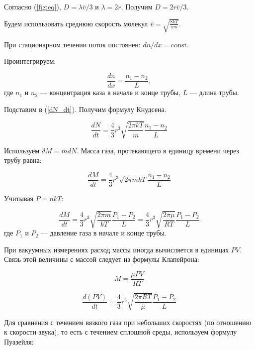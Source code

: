 \documentclass[a4paper,12pt]{article} %
\begin{document}
Согласно (\ref{fig:eq}), $D = \lambda \bar{v} / 3$ и $\lambda = 2r$. Получим $D = 2r \bar{v} / 3$. 

Будем использовать среднюю скорость молекул $\bar{v} = \sqrt{\frac{8kT}{\pi m}}$.

При стационарном течении поток постоянен: $dn/dx = \text{const}$. 

Проинтегрируем:

\begin{equation}
  \frac{dn}{dx} = \frac{n_1 - n_2}{L},
\end{equation}
где $n_1$ и $n_2$ — концентрация каза в начале и конце трубы, $L$ — длина трубы.

Подставим в (\ref{dN_dt}). Получим формулу Кнудсена.

\begin{equation}
  \frac{dN}{dt} = \frac{4}{3} r^3 \sqrt{\frac{2 \pi k T}{m}} \frac{n_1 - n_2}{L}
\end{equation}

Используем $dM = mdN$. Масса газа, протекающего в единицу времени через трубу равна:

\begin{equation}
  \frac{dM}{dt} = \frac{4}{3} r^3 \sqrt{2 \pi m k T} \frac{n_1 - n_2}{L}
\end{equation}

Учитывая $P = nkT$:

\begin{equation}
  \frac{dM}{dt} = \frac{4}{3} r^3 \sqrt{\frac{2 \pi m}{k T}}\frac{P_1 - P_2}{L} = \frac{4}{3} r^3 \sqrt{\frac{2 \pi \mu}{R T}}\frac{P_1 - P_2}{L} 
  \label{r3}
\end{equation}
где $P_1$ и $P_2$ — давление газа в начале и конце трубы.

При вакуумных измерениях расход массы иногда вычисляется в единицах $PV$. Связь этой величины с массой следует из формулы Клапейрона:

\begin{equation}
  M = \frac{\mu P V}{R T}
\end{equation}

\begin{equation}
  \frac{d(PV)}{dt} = \frac{4}{3} r^3 \sqrt{\frac{2 \pi R T}{\mu}} \frac{P_1 - P_2}{L}
\end{equation}

Для сравнения с течением вязкого газа при небольших скоростях (по отношению к скорости звука), то есть с течением сплошной среды, используем формулу Пуазейля:
\end{document}
